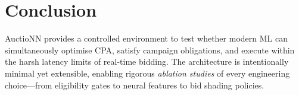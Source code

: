 \documentclass[11pt]{article}
\begin{document}
\section{Conclusion}
AuctioNN provides a controlled environment to test whether modern ML
can simultaneously optimise CPA, satisfy campaign obligations, and
execute within the harsh latency limits of real-time bidding.  The
architecture is intentionally minimal yet extensible, enabling
rigorous \emph{ablation studies} of every engineering choice—from
eligibility gates to neural features to bid shading policies.



\end{document}
